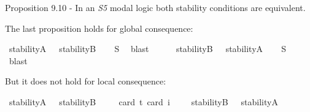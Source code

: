 \begin{isabellebody}
\begin{isamarkuptext}%
Proposition 9.10 - In an \emph{S5} modal logic both stability conditions are equivalent.%
\end{isamarkuptext}\isamarkuptrue%
%
\begin{isamarkuptext}%
The last proposition holds for global consequence:%
\end{isamarkuptext}\isamarkuptrue%
\isamarkupfalse%
\ {\isachardoublequoteopen}{\isasymlfloor}stabilityA\ {\isacharparenleft}{\isasymtau}{\isacharcolon}{\isacharcolon}{\isasymup}{\isasymlangle}{\isasymzero}{\isasymrangle}{\isacharparenright}{\isasymrfloor}\ {\isasymlongrightarrow}\ {\isasymlfloor}stabilityB\ {\isasymtau}{\isasymrfloor}{\isachardoublequoteclose}%
\isadelimproof
\ %
\endisadelimproof
%
\isatagproof
{}\isamarkupfalse%
\ S{}\ \isamarkupfalse%
\ blast%
\endisatagproof
{\isafoldproof}%
%
\isadelimproof
%
\endisadelimproof
\ \ \ \ \isanewline
{}\isamarkupfalse%
\ {\isachardoublequoteopen}{\isasymlfloor}stabilityB\ {\isacharparenleft}{\isasymtau}{\isacharcolon}{\isacharcolon}{\isasymup}{\isasymlangle}{\isasymzero}{\isasymrangle}{\isacharparenright}{\isasymrfloor}\ {\isasymlongrightarrow}\ {\isasymlfloor}stabilityA\ {\isasymtau}{\isasymrfloor}{\isachardoublequoteclose}%
\isadelimproof
\ %
\endisadelimproof
%
\isatagproof
{}\isamarkupfalse%
\ S{}\ \isamarkupfalse%
\ blast%
\endisatagproof
{\isafoldproof}%
%
\isadelimproof
%
\endisadelimproof
%
\begin{isamarkuptext}%
But it does not hold for local consequence:%
\end{isamarkuptext}\isamarkuptrue%
\isamarkupfalse%
\ {\isachardoublequoteopen}{\isasymlfloor}stabilityA\ {\isacharparenleft}{\isasymtau}{\isacharcolon}{\isacharcolon}{\isasymup}{\isasymlangle}{\isasymzero}{\isasymrangle}{\isacharparenright}\ \isactrlbold {\isasymrightarrow}\ stabilityB\ {\isasymtau}{\isasymrfloor}{\isachardoublequoteclose}\ \isanewline
\ \ \isamarkupfalse%
{\isacharbrackleft}card\ {\isacharprime}t{\isacharequal}{}{\isacharcomma}\ card\ i{\isacharequal}{}{\isacharbrackright}%
\isadelimproof
\ %
\endisadelimproof
%
\isatagproof
{}\isamarkupfalse%
\ %
%
\endisatagproof
{\isafoldproof}%
%
\isadelimproof
%
\endisadelimproof
\isanewline
{}\isamarkupfalse%
\ {\isachardoublequoteopen}{\isasymlfloor}stabilityB\ {\isacharparenleft}{\isasymtau}{\isacharcolon}{\isacharcolon}{\isasymup}{\isasymlangle}{\isasymzero}{\isasymrangle}{\isacharparenright}\ \isactrlbold {\isasymrightarrow}\ stabilityA\ {\isasymtau}{\isasymrfloor}{\isachardoublequoteclose}\ \isanewline

\end{isabellebody}
